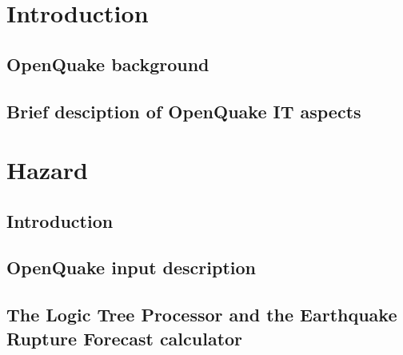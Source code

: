\documentclass[12pt,a4paper,headings=small,version=first,dvips]{scrbook}
\begin{document}
\part{Introduction}
\chapter{OpenQuake background}
	
\chapter{Brief desciption of OpenQuake IT aspects}
	
\part{Hazard}
\chapter{Introduction}
	
\chapter{OpenQuake input description}
	\label{chap:hazinp}
	
\chapter{The Logic Tree Processor and the Earthquake Rupture Forecast 
	calculator}
	\label{chap:erf}
	
	
\end{document}
